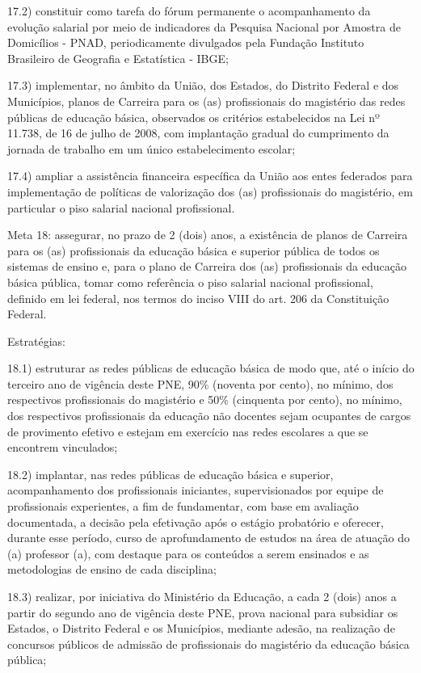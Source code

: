 \documentclass[
]{book}
\begin{document}
17.2) constituir como tarefa do fórum permanente o acompanhamento da evolução salarial por meio de indicadores da Pesquisa Nacional por Amostra de Domicílios - PNAD, periodicamente divulgados pela Fundação Instituto Brasileiro de Geografia e Estatística - IBGE;

17.3) implementar, no âmbito da União, dos Estados, do Distrito Federal e dos Municípios, planos de Carreira para os (as) profissionais do magistério das redes públicas de educação básica, observados os critérios estabelecidos na Lei nº 11.738, de 16 de julho de 2008, com implantação gradual do cumprimento da jornada de trabalho em um único estabelecimento escolar;

17.4) ampliar a assistência financeira específica da União aos entes federados para implementação de políticas de valorização dos (as) profissionais do magistério, em particular o piso salarial nacional profissional.

Meta 18: assegurar, no prazo de 2 (dois) anos, a existência de planos de Carreira para os (as) profissionais da educação básica e superior pública de todos os sistemas de ensino e, para o plano de Carreira dos (as) profissionais da educação básica pública, tomar como referência o piso salarial nacional profissional, definido em lei federal, nos termos do inciso VIII do art. 206 da Constituição Federal.

Estratégias:

18.1) estruturar as redes públicas de educação básica de modo que, até o início do terceiro ano de vigência deste PNE, 90\% (noventa por cento), no mínimo, dos respectivos profissionais do magistério e 50\% (cinquenta por cento), no mínimo, dos respectivos profissionais da educação não docentes sejam ocupantes de cargos de provimento efetivo e estejam em exercício nas redes escolares a que se encontrem vinculados;

18.2) implantar, nas redes públicas de educação básica e superior, acompanhamento dos profissionais iniciantes, supervisionados por equipe de profissionais experientes, a fim de fundamentar, com base em avaliação documentada, a decisão pela efetivação após o estágio probatório e oferecer, durante esse período, curso de aprofundamento de estudos na área de atuação do (a) professor (a), com destaque para os conteúdos a serem ensinados e as metodologias de ensino de cada disciplina;

18.3) realizar, por iniciativa do Ministério da Educação, a cada 2 (dois) anos a partir do segundo ano de vigência deste PNE, prova nacional para subsidiar os Estados, o Distrito Federal e os Municípios, mediante adesão, na realização de concursos públicos de admissão de profissionais do magistério da educação básica pública;
\end{document}
